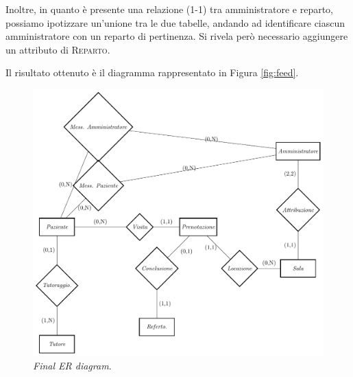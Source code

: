 Inoltre, in quanto è presente una relazione (1-1) tra amministratore e reparto,
possiamo ipotizzare un'unione tra le due tabelle, andando ad identificare ciascun
amministratore con un reparto di pertinenza. Si rivela però necessario aggiungere
un attributo di \textsc{Reparto}.

Il risultato ottenuto è il diagramma rappresentato in Figura \vref{fig:feed}.

\begin{figure}[!t]
\includegraphics[scale=0.8]{er2/second}
\caption{\textit{Final ER diagram}.}
\label{fig:feed}
\end{figure}

